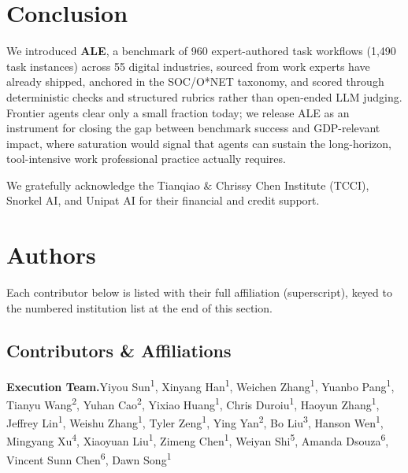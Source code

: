 \documentclass{llmxive}
\providecommand{\taskcount}{55}
\providecommand{\totaltasks}{960}
\providecommand{\totalvariants}{1{,}490}
\providecommand{\contentsname}{Appendix Table of Contents}
\begin{document}
\section{Conclusion}
\label{sec:conclusion}

We introduced \textbf{ALE}, a benchmark of \totaltasks{} expert-authored task workflows (\totalvariants{} task instances) across \taskcount{} digital industries, sourced from work experts have already shipped, anchored in the SOC/O*NET taxonomy, and scored through deterministic checks and structured rubrics rather than open-ended LLM judging. Frontier agents clear only a small fraction today; we release ALE as an instrument for closing the gap between benchmark success and GDP-relevant impact, where saturation would signal that agents can sustain the long-horizon, tool-intensive work professional practice actually requires.

\begin{ack}
We gratefully acknowledge the Tianqiao \& Chrissy Chen Institute (TCCI), Snorkel AI, and Unipat AI for their financial and credit support.
\end{ack}


{\small


}

\appendix
{}


\begingroup
\hypersetup{linkcolor=black}
\renewcommand{\contentsname}{Appendix Table of Contents}
\setcounter{tocdepth}{2}
\localtableofcontents
\endgroup


\section{Authors}
\label{app:authors}
Each contributor below is listed with their full affiliation (superscript), keyed to the numbered institution list at the end of this section.

\subsection{Contributors \& Affiliations}

\noindent\textbf{Execution Team.}\quad Yiyou Sun\textsuperscript{1}, Xinyang Han\textsuperscript{1}, Weichen Zhang\textsuperscript{1}, Yuanbo Pang\textsuperscript{1}, Tianyu Wang\textsuperscript{2}, Yuhan Cao\textsuperscript{2}, Yixiao Huang\textsuperscript{1}, Chris Duroiu\textsuperscript{1}, Haoyun Zhang\textsuperscript{1}, Jeffrey Lin\textsuperscript{1}, Weishu Zhang\textsuperscript{1}, Tyler Zeng\textsuperscript{1}, Ying Yan\textsuperscript{2}, Bo Liu\textsuperscript{3}, Hanson Wen\textsuperscript{1}, Mingyang Xu\textsuperscript{4}, Xiaoyuan Liu\textsuperscript{1}, Zimeng Chen\textsuperscript{1}, Weiyan Shi\textsuperscript{5}, Amanda Dsouza\textsuperscript{6}, Vincent Sunn Chen\textsuperscript{6}, Dawn Song\textsuperscript{1}\par
\vspace{4pt}
\end{document}
